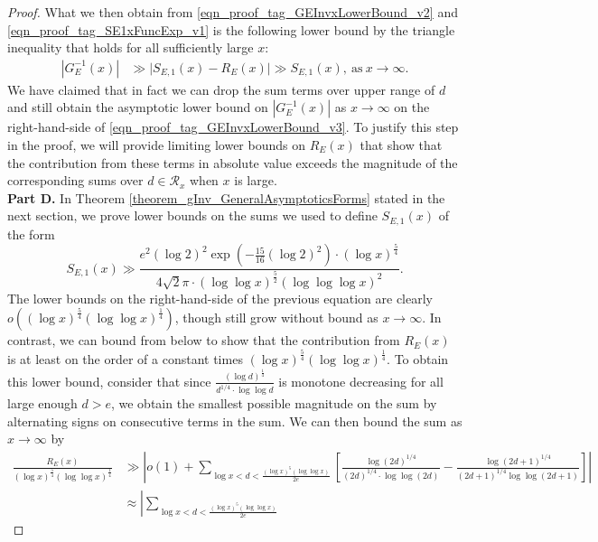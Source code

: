 \documentclass[11pt,reqno,a4letter]{article}
\numberwithin{figure}{section}
\numberwithin{table}{section}
\theoremstyle{plain}
\numberwithin{theorem}{section}
\theoremstyle{definition}
\begin{document}
\begin{proof}
What we then obtain from 
\eqref{eqn_proof_tag_GEInvxLowerBound_v2} and \eqref{eqn_proof_tag_SE1xFuncExp_v1} 
is the following lower bound by the triangle inequality 
that holds for all sufficiently large $x$: 
\begin{align} 
\label{eqn_proof_tag_GEInvxLowerBound_v3}
|G_E^{-1}(x)| & \gg 
     \Biggl\lvert S_{E,1}(x) - R_E(x) \Biggr\rvert \gg S_{E,1}(x), \mathrm{\ as\ } 
     x \rightarrow \infty. 
\end{align} 
We have claimed that in fact we can drop the sum terms over upper range of $d$ and still 
obtain the asymptotic lower bound on $|G_E^{-1}(x)|$ as $x \rightarrow \infty$ on the 
right-hand-side of \eqref{eqn_proof_tag_GEInvxLowerBound_v3}. 
To justify this step in the proof, 
we will provide limiting lower bounds on $R_E(x)$ that show that the 
contribution from these terms in absolute value exceeds the magnitude of the 
corresponding sums over $d \in \mathcal{R}_x$ when $x$ is large. \\ 
\textbf{Part D.} 
In Theorem \ref{theorem_gInv_GeneralAsymptoticsForms} stated in the next section, 
we prove lower bounds on the sums we used to 
define $S_{E,1}(x)$ of the form 
\[
S_{E,1}(x) \gg \frac{e^2 (\log 2)^2 \exp\left(-\frac{15}{16} (\log 2)^2\right) \cdot 
     (\log x)^{\frac{5}{4}}}{4 \sqrt{2} \pi \cdot  
     (\log\log x)^{\frac{5}{2}} (\log\log\log x)^2}. 
\]
The lower bounds on the right-hand-side of the previous equation are clearly 
$o\left((\log x)^{\frac{5}{4}} (\log\log x)^{\frac{1}{4}}\right)$, though still grow 
without bound as $x \rightarrow \infty$. 
In contrast, we can bound from below to show that the contribution from 
$R_E(x)$ is at least on the order of a constant 
times $(\log x)^{\frac{5}{4}} (\log\log x)^{\frac{1}{4}}$. 
To obtain this lower bound, consider 
that since $\frac{(\log d)^{\frac{1}{4}}}{d^{1/4} \cdot \log\log d}$ 
is monotone decreasing for all large enough $d > e$, 
we obtain the smallest possible magnitude on the sum 
by alternating signs on consecutive terms in the sum. 
We can then bound the sum as $x \rightarrow \infty$ by 
\begin{align*} 
\frac{R_E(x)}{(\log x)^{\frac{5}{4}} (\log\log x)^{\frac{1}{4}}} & \gg 
     \left\lvert o(1) + 
     \sum_{\log x < d < \frac{(\log x)^{5} (\log\log x)}{2e}} 
     \left[ 
     \frac{\log(2d)^{1/4}}{(2d)^{1/4} \cdot \log\log(2d)} - 
     \frac{\log(2d+1)^{1/4}}{(2d+1)^{1/4} \log\log(2d+1)} 
     \right] \right\rvert \\ 
     & \approx \left\lvert 
     \sum_{\log x < d < \frac{(\log x)^{5} (\log\log x)}{2e}} 

\end{align*}
\end{proof}
\end{document}
